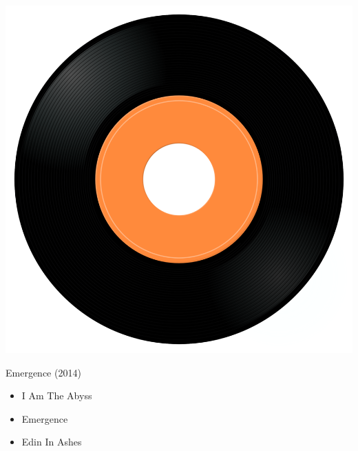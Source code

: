 \begin{minipage}[t]{0.25\textwidth}\vspace{0pt}
\captionsetup{type=figure}
\includegraphics[width=\textwidth]{Images/cover.png}
\caption*{Emergence (2014)}
\end{minipage}
\begin{minipage}[t]{0.25\textwidth}\vspace{0pt}
\begin{itemize}[nosep,leftmargin=1em,labelwidth=*,align=left]
	\setlength{\itemsep}{0pt}
	\item I Am The Abyss
	\item Emergence
	\item Edin In Ashes
\end{itemize}
\end{minipage}
